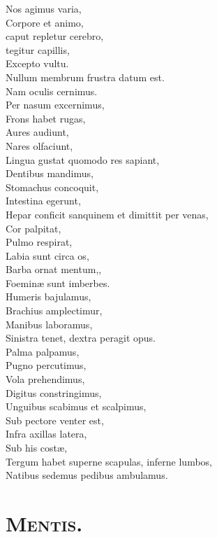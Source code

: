 \documentclass[12pt, twocolumn]{memoir}
\begin{document}
Nos agimus varia,\\
Corpore et animo,\\
caput repletur cerebro,\\
tegitur capillis,\\
Excepto vultu.\\
Nullum membrum frustra datum est.\\
Nam oculis cernimus.\\
Per nasum excernimus,\\
Frons habet rugas,\\
Aures audiunt,\\
Nares olfaciunt,\\
Lingua gustat quomodo res sapiant,\\
Dentibus mandimus,\\
Stomachus concoquit,\\
Intestina egerunt,\\
Hepar conficit sanquinem et dimittit per venas,\\
Cor palpitat,\\
Pulmo respirat,\\
Labia sunt circa os,\\
Barba ornat mentum,,\\
Foeminæ sunt imberbes.\\
Humeris bajulamus,\\
Brachius amplectimur,\\
Manibus laboramus,\\
Sinistra tenet, dextra peragit opus.\\
Palma palpamus,\\
Pugno percutimus,\\
Vola prehendimus,\\
Digitus constringimus,\\
Unguibus scabimus et scalpimus,\\
Sub pectore venter est,\\
Infra axillas latera,\\
Sub his costæ,\\
Tergum habet superne scapulas, inferne lumbos,\\
Natibus sedemus pedibus ambulamus.\\

\section*{\textsc{Mentis.}}
\end{document}
